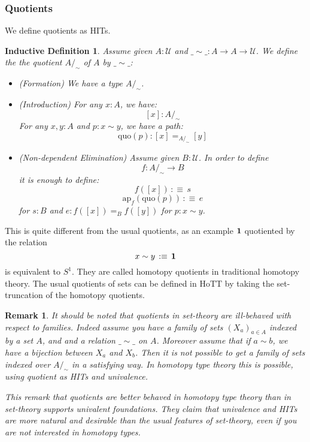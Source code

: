 \documentclass{article}
\newcommand{\ssse}[1]{\subsubsection*{#1}}
\newcommand{\U}{{\mathcal U}}
\renewcommand{\r}{\rightarrow}
\newcommand{\ap}{\mathrm{ap}}
\newcommand{\one}{{\bf 1}}
\newtheorem{remark}{Remark}
\newtheorem{ind_def}{Inductive Definition}
\begin{document}
\ssse{Quotients}

We define quotients as HITs. 

\begin{ind_def}
Assume given $A:\U$ and $\_\sim\_:A\r A\r \U$. We define the the quotient $A/_\sim$ of $A$ by $\_\sim\_$:
\begin{itemize}
\item (Formation) We have a type $A/_\sim$.
\item (Introduction) For any $x:A$, we have:
\[[x] : A/_\sim\] 
For any $x,y:A$ and $p:x\sim y$, we have a path:
\[\mathrm{quo}(p) : [x] =_{A/_\sim} [y]\]
\item (Non-dependent Elimination) Assume given $B : \U$. In order to define 
\[f:A/_\sim\r B\]
 it is enough to define:
\[f([x]) \, :\equiv \, s \]
\[\ap_f(\mathrm{quo}(p)) \, :\equiv\, e\]
for $s:B$ and $e:f([x])=_{B}f([y])$ for $p:x\sim y$.
\end{itemize}
\end{ind_def}

This is quite different from the usual quotients, as an example $\one$ quotiented by the relation 
\[x\sim y \, :\equiv\, \one\]
is equivalent to $S^1$. They are called homotopy quotients in traditional homotopy theory. The usual quotients of sets can be defined in HoTT by taking the set-truncation of the homotopy quotients. 

\begin{remark}
It should be noted that quotients in set-theory are ill-behaved with respect to families. Indeed assume you have a family of sets $(X_a)_{a\in A}$ indexed by a set $A$, and and a relation $\_\sim\_$ on $A$.%
Moreover assume that if $a\sim b$, we have a bijection between $X_a$ and $X_b$. Then it is not possible to get a family of sets indexed over $A/_\sim$ in a satisfying way. In homotopy type theory this is possible, using quotient as HITs and univalence.


This remark that quotients are better behaved in homotopy type theory than in set-theory supports \emph{univalent foundations}. They claim that univalence and HITs are more natural and desirable than the usual features of set-theory, even if you are not interested in homotopy types. %
 \end{remark}
\end{document}
